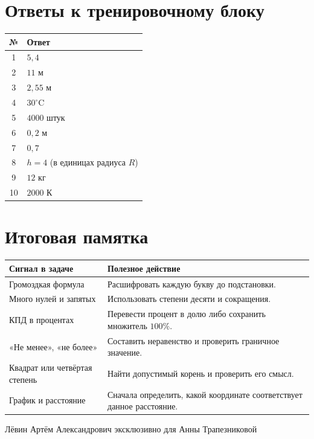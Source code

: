 \documentclass[a4paper,11pt]{article}
\newcommand{\topic}[1]{\section*{\textcolor{darkaccent}{#1}}}
\begin{document}
\clearpage
\topic{Ответы к тренировочному блоку}
\vspace{5mm}
\begin{center}
\renewcommand{\arraystretch}{1.55}
\begin{tabularx}{.84\linewidth}{@{}cX@{}}
\toprule
\textbf{№} & \textbf{Ответ}\\
\midrule
1 & $5{,}4$\\
2 & $11$ м\\
3 & $2{,}55$ м\\
4 & $30^\circ\text{C}$\\
5 & $4000$ штук\\
6 & $0{,}2$ м\\
7 & $0{,}7$\\
8 & $h=4$ (в единицах радиуса $R$)\\
9 & $12$ кг\\
10 & $2000$ К\\
\bottomrule
\end{tabularx}
\end{center}
\vspace{12mm}
\topic{Итоговая памятка}
\begin{center}
\begin{tabularx}{\linewidth}{@{}p{.34\linewidth}X@{}}
\toprule
\textbf{Сигнал в задаче} & \textbf{Полезное действие}\\
\midrule
Громоздкая формула & Расшифровать каждую букву до подстановки.\\
Много нулей и запятых & Использовать степени десяти и сокращения.\\
КПД в процентах & Перевести процент в долю либо сохранить множитель $100\%$.\\
«Не менее», «не более» & Составить неравенство и проверить граничное значение.\\
Квадрат или четвёртая степень & Найти допустимый корень и проверить его смысл.\\
График и расстояние & Сначала определить, какой координате соответствует данное расстояние.\\
\bottomrule
\end{tabularx}
\end{center}
\vfill
\begin{center}
{\small\color{mute}Лёвин Артём Александрович эксклюзивно для Анны Трапезниковой}
\end{center}
\end{document}
